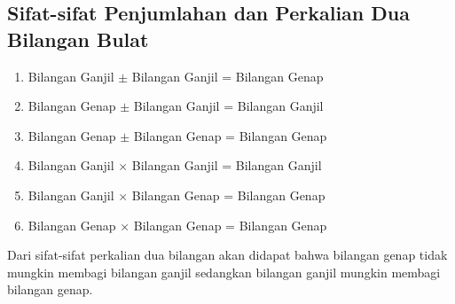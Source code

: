 \subsection{Sifat-sifat Penjumlahan dan Perkalian Dua Bilangan Bulat}
    \begin{enumerate}
        \item Bilangan Ganjil $\pm$ Bilangan Ganjil = Bilangan Genap 
        \item Bilangan Genap $\pm$ Bilangan Ganjil = Bilangan Ganjil 
        \item Bilangan Genap $\pm$ Bilangan Genap = Bilangan Genap 
        \item Bilangan Ganjil $\times$ Bilangan Ganjil = Bilangan Ganjil 
        \item Bilangan Ganjil $\times$ Bilangan Genap = Bilangan Genap 
        \item Bilangan Genap $\times$ Bilangan Genap = Bilangan Genap
    \end{enumerate}
    Dari sifat-sifat perkalian dua bilangan akan didapat bahwa bilangan genap tidak mungkin membagi 
    bilangan ganjil sedangkan bilangan ganjil mungkin membagi bilangan genap. 


    